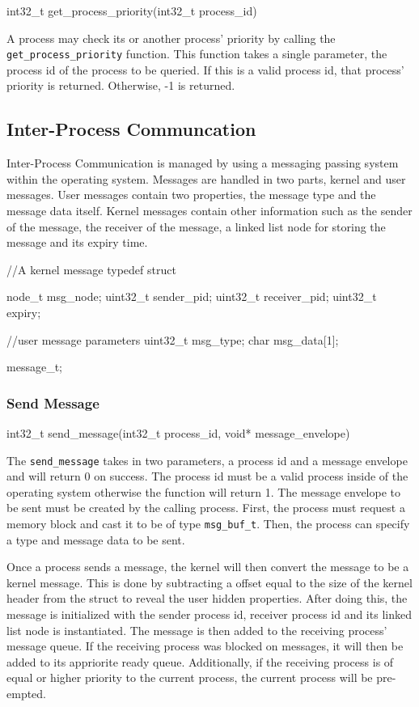 \documentclass[se]{uw-wkrpt}
\begin{document}
\begin{code}
int32_t get_process_priority(int32_t process_id)
\end{code}

A process may check its or another process' priority by calling the \texttt{get\_process\_priority} function. This function takes a single parameter, the process id of the process to be queried. If this is a valid process id, that process' priority is returned. Otherwise, -1 is returned.

\subsection{Inter-Process Communcation} \label{sec:ipc}

Inter-Process Communication is managed by using a messaging passing system within the operating system. Messages are handled in two parts, kernel and user messages. User messages contain two properties, the message type and the message data itself. Kernel messages contain other information such as the sender of the message, the receiver of the message, a linked list node for storing the message and its expiry time.

\begin{code}
//A kernel message
typedef struct {
    node_t msg_node;
    uint32_t sender_pid;
    uint32_t receiver_pid;
    uint32_t expiry;
    
    //user message parameters
    uint32_t msg_type;
    char msg_data[1];
} message_t;
\end{code}

\subsubsection{Send Message}

\begin{code}
int32_t send_message(int32_t process_id, void* message_envelope)
\end{code}

The \texttt{send\_message} takes in two parameters, a process id and a message envelope and will return 0 on success. The process id must be a valid process inside of the operating system otherwise the function will return 1. The message envelope to be sent must be created by the calling process. First, the process must request a memory block and cast it to be of type \texttt{msg\_buf\_t}. Then, the process can specify a type and message data to be sent.

Once a process sends a message, the kernel will then convert the message to be a kernel message. This is done by subtracting a offset equal to the size of the kernel header from the struct to reveal the user hidden properties. After doing this, the message is initialized with the sender process id, receiver process id and its linked list node is instantiated. The message is then added to the receiving process' message queue. If the receiving process was blocked on messages, it will then be added to its appriorite ready queue. Additionally, if the receiving process is of equal or higher priority to the current process, the current process will be pre-empted.
\end{document}
